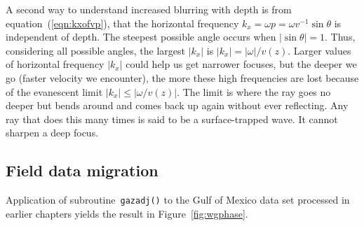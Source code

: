 A second way to understand increased blurring with depth
is from equation~(\ref{eqn:kxofvp}),
that the horizontal frequency $k_x=\omega p = \omega v^{-1}\sin\theta$
is independent of depth.
The steepest possible angle occurs when $|\sin\theta| = 1$.
Thus, considering all possible angles,
the largest $|k_x|$ is $|k_x|=|\omega|/v(z)$.
Larger values of horizontal frequency $|k_x|$
could help us get narrower focuses,
but the deeper we go (faster velocity we encounter),
the more these high frequencies are lost
because of the evanescent limit $|k_x|\le |\omega/v(z)|$.
The limit is where the ray goes no deeper but bends around and
comes back up again without ever reflecting.
Any ray that does this many times is said to be a surface-trapped wave.
It cannot sharpen a deep focus.

%

\subsection{Field data migration}
Application of subroutine~\texttt{gazadj()} 
to the Gulf of Mexico data set processed in earlier chapters
yields the result in Figure~\ref{fig:wgphase}.

